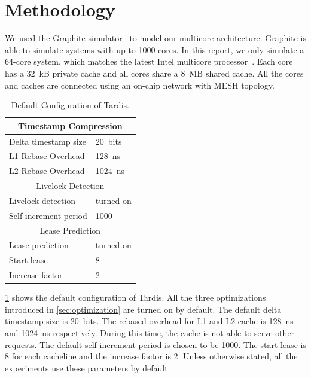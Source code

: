 \documentclass[12pt]{article}
\begin{document}
\section{Methodology}

We used the Graphite simulator~\cite{graphite} to model our multicore 
architecture. Graphite is able to simulate 
systems with up to 1000 cores. In this report, we only simulate a 
64-core system, which matches the latest Intel multicore 
processor~\cite{xeonphi}. Each core has a 32~kB private cache and all 
cores share a 8~MB shared cache. All the cores and caches are 
connected using an on-chip network with MESH topology.

\begin{table}
	\caption{ Default Configuration of Tardis. }
	\begin{center}
	{ 
		\begin{tabular}{|l|l|}
            \hline
			\multicolumn{2}{|c|}{Timestamp Compression} \\
			\hline
			Delta timestamp size 		& 20~bits \\
			L1 Rebase Overhead 			& 128~ns\\
			L2 Rebase Overhead			& 1024~ns \\
			\hline
			\multicolumn{2}{|c|}{Livelock Detection} \\
			\hline
			Livelock detection 			& turned on \\
			Self increment period 		& 1000 \\
			\hline
			\multicolumn{2}{|c|}{Lease Prediction} \\
			\hline
			Lease prediction			& turned on \\
			Start lease 				& 8 \\
			Increase factor				& 2 \\
			\hline
		\end{tabular}
    }
	\end{center}
    \label{tab:system}
	\vspace{-.2in}
\end{table}

\cref{tab:system} shows the default configuration of Tardis. All the 
three optimizations introduced in \cref{sec:optimization} are turned 
on by default. The default delta timestamp size is 20~bits. The
rebased overhead for L1 and L2 cache is 128~ns and 1024~ns 
respectively. During this time, the cache is not able to serve other 
requests. The default self increment period is chosen to be 1000. The 
start lease is 8 for each cacheline and the increase factor is 2. 
Unless otherwise stated, all the experiments use these parameters by 
default.
\end{document}
